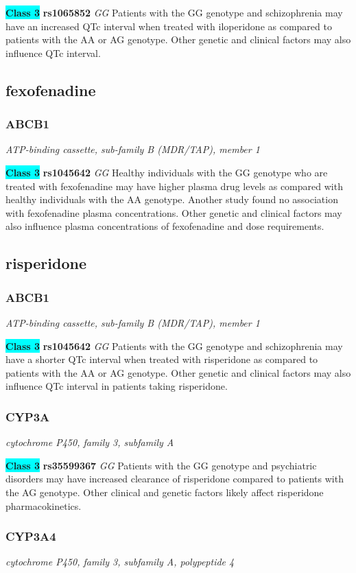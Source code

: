\documentclass{report}
\begin{document}
\textbf{\colorbox{cyan} {Class 3}} \textbf{ rs1065852 } \textit{ GG }
Patients with the GG genotype and schizophrenia may have an increased QTc interval when treated with iloperidone as compared to patients with the AA or AG genotype. Other genetic and clinical factors may also influence QTc interval.\newline\subsection{ fexofenadine }\subsubsection{ ABCB1 }
\textit{ ATP-binding cassette, sub-family B (MDR/TAP), member 1 }

\textbf{\colorbox{cyan} {Class 3}} \textbf{ rs1045642 } \textit{ GG }
Healthy individuals with the GG genotype who are treated with fexofenadine may have higher plasma drug levels as compared with healthy individuals with the AA genotype. Another study found no association with fexofenadine plasma concentrations. Other genetic and clinical factors may also influence plasma concentrations of fexofenadine and dose requirements.\newline\subsection{ risperidone }\subsubsection{ ABCB1 }
\textit{ ATP-binding cassette, sub-family B (MDR/TAP), member 1 }

\textbf{\colorbox{cyan} {Class 3}} \textbf{ rs1045642 } \textit{ GG }
Patients with the GG genotype and schizophrenia may have a shorter QTc interval when treated with risperidone as compared to patients with the AA or AG genotype. Other genetic and clinical factors may also influence QTc interval in patients taking risperidone.\newline\subsubsection{ CYP3A }
\textit{ cytochrome P450, family 3, subfamily A }

\textbf{\colorbox{cyan} {Class 3}} \textbf{ rs35599367 } \textit{ GG }
Patients with the GG genotype and psychiatric disorders may have increased clearance of risperidone compared to patients with the AG genotype. Other clinical and genetic factors likely affect risperidone pharmacokinetics.\newline\subsubsection{ CYP3A4 }
\textit{ cytochrome P450, family 3, subfamily A, polypeptide 4 }
\end{document}
